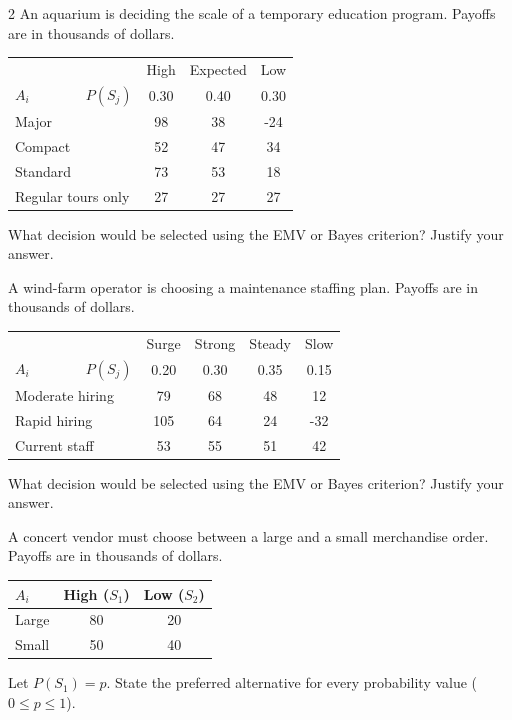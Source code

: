 \begin{multicols}{2}
		An aquarium is deciding the scale of a temporary education program. Payoffs are in thousands of dollars.\vspace{-3mm}
		\begin{center}\setlength{\tabcolsep}{2pt}\renewcommand{\arraystretch}{1.1}
			\begin{tabular}{lccc}\toprule
			&High&Expected&Low\\
			$A_i \qquad \qquad P(S_j)$&0.30&0.40&0.30\\ \midrule
			Major&98&38&-24\\
			Compact&52&47&34\\
			Standard&73&53&18\\
			Regular tours only&27&27&27\\ \bottomrule
			\end{tabular}
		\end{center}\vspace{-3mm}
		What decision would be selected using the EMV or Bayes criterion? Justify your answer.\vspace{-3mm}

		A wind-farm operator is choosing a maintenance staffing plan. Payoffs are in thousands of dollars.\vspace{-3mm}
		\begin{center}\setlength{\tabcolsep}{1.5pt}\renewcommand{\arraystretch}{1.1}
			\begin{tabular}{lcccc}\toprule
			&Surge&Strong&Steady&Slow\\
			$A_i \qquad \qquad P(S_j)$&0.20&0.30&0.35&0.15\\ \midrule
			Moderate hiring&79&68&48&12\\
			Rapid hiring&105&64&24&-32\\
			Current staff&53&55&51&42\\ \bottomrule
			\end{tabular}
		\end{center}\vspace{-3mm}
		What decision would be selected using the EMV or Bayes criterion? Justify your answer.

		A concert vendor must choose between a large and a small merchandise order. Payoffs are in thousands of dollars.\vspace{-3mm}
		\begin{center}\setlength{\tabcolsep}{4pt}\renewcommand{\arraystretch}{1.15}
			\begin{tabular}{lcc}\toprule
			$A_i$&High ($S_1$)&Low ($S_2$)\\ \midrule
			Large &80&20\\
			Small &50&40\\ \bottomrule
			\end{tabular}
		\end{center}\vspace{-2mm}
		Let $P(S_1)=p$. State the preferred alternative for every probability value ($0\le p\le1$).


\end{multicols}
